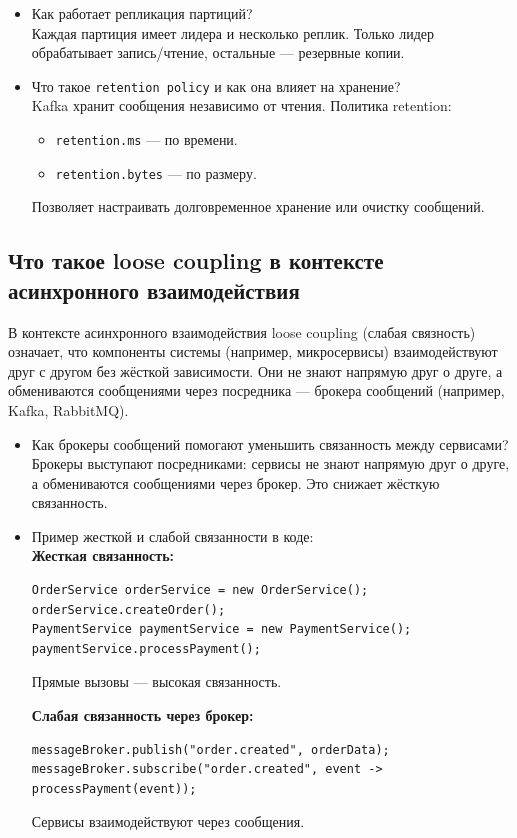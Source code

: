 \documentclass[a4paper,14pt]{article}
\begin{document}
\begin{itemize}
\item Как работает репликация партиций? \\
Каждая партиция имеет лидера и несколько реплик. Только лидер обрабатывает запись/чтение, остальные — резервные копии.

\item Что такое \texttt{retention policy} и как она влияет на хранение? \\
Kafka хранит сообщения независимо от чтения. Политика retention:
\begin{itemize}
  \item \texttt{retention.ms} — по времени.
  \item \texttt{retention.bytes} — по размеру.
\end{itemize}
Позволяет настраивать долговременное хранение или очистку сообщений.
\end{itemize}
\subsection{Что такое loose coupling в контексте асинхронного взаимодействия}
В контексте асинхронного взаимодействия loose coupling (слабая связность) означает, что компоненты системы (например, микросервисы) взаимодействуют друг с другом без жёсткой зависимости. Они не знают напрямую друг о друге, а обмениваются сообщениями через посредника — брокера сообщений (например, Kafka, RabbitMQ).

\begin{itemize}
\item Как брокеры сообщений помогают уменьшить связанность между сервисами? \\
Брокеры выступают посредниками: сервисы не знают напрямую друг о друге, а обмениваются сообщениями через брокер. Это снижает жёсткую связанность.

\item Пример жесткой и слабой связанности в коде: \\
\textbf{Жесткая связанность:}
\begin{lstlisting}[style=javastyle]
OrderService orderService = new OrderService();
orderService.createOrder();
PaymentService paymentService = new PaymentService();
paymentService.processPayment();
\end{lstlisting}
Прямые вызовы — высокая связанность.

\textbf{Слабая связанность через брокер:}
\begin{lstlisting}[style=javastyle]
messageBroker.publish("order.created", orderData);
messageBroker.subscribe("order.created", event -> processPayment(event));
\end{lstlisting}
Сервисы взаимодействуют через сообщения.
\end{itemize}
\end{document}
